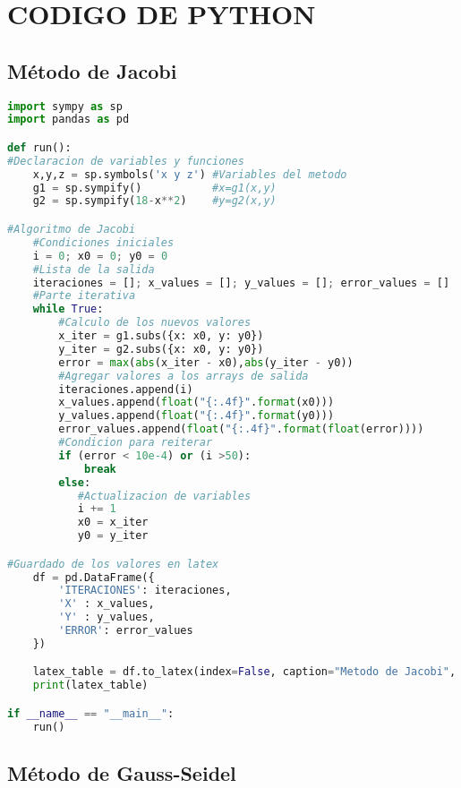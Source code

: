 \section{CODIGO DE PYTHON}
    \subsection{Método de Jacobi}
 \begin{lstlisting}[language=Python,style=mystyle]
import sympy as sp
import pandas as pd

def run():
#Declaracion de variables y funciones
    x,y,z = sp.symbols('x y z') #Variables del metodo
    g1 = sp.sympify()           #x=g1(x,y)
    g2 = sp.sympify(18-x**2)    #y=g2(x,y)

#Algoritmo de Jacobi
    #Condiciones iniciales
    i = 0; x0 = 0; y0 = 0
    #Lista de la salida
    iteraciones = []; x_values = []; y_values = []; error_values = []
    #Parte iterativa
    while True:
        #Calculo de los nuevos valores
        x_iter = g1.subs({x: x0, y: y0})
        y_iter = g2.subs({x: x0, y: y0})
        error = max(abs(x_iter - x0),abs(y_iter - y0))
        #Agregar valores a los arrays de salida
        iteraciones.append(i)
        x_values.append(float("{:.4f}".format(x0)))
        y_values.append(float("{:.4f}".format(y0)))
        error_values.append(float("{:.4f}".format(float(error))))
        #Condicion para reiterar
        if (error < 10e-4) or (i >50):
            break
        else:
           #Actualizacion de variables
           i += 1
           x0 = x_iter
           y0 = y_iter

#Guardado de los valores en latex
    df = pd.DataFrame({
        'ITERACIONES': iteraciones,
        'X' : x_values,
        'Y' : y_values,
        'ERROR': error_values
    })

    latex_table = df.to_latex(index=False, caption="Metodo de Jacobi", label="Jacobi Table")
    print(latex_table)

if __name__ == "__main__":
    run()
	\end{lstlisting}

	\subsection{Método de Gauss-Seidel}
